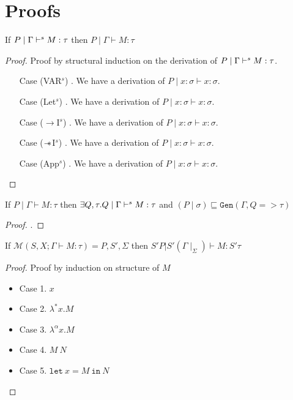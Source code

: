 \chapter{Proofs}
\begin{thm}\label{thm:soundness-syntax-directed}
   If $P \mid \Gamma \vdash^s M:\tau$ then $P \mid \Gamma \vdash M:\tau$
\end{thm}
\begin{proof}
  Proof by structural induction on the derivation of $P \mid \Gamma \vdash^s M:\tau$.
  \begin{itemize}
  \item[Case (VAR$^s$)]. We have a derivation of $P \mid x:\sigma \vdash x:\sigma$.
  \item[Case (Let$^s$)]. We have a derivation of $P \mid x:\sigma \vdash x:\sigma$.
  \item[Case ($\rightarrow$I$^s$)]. We have a derivation of $P \mid x:\sigma \vdash x:\sigma$.
  \item[Case ($\mathrel{-\mkern-6mu*}$I$^s$)]. We have a derivation of $P \mid x:\sigma \vdash x:\sigma$.
  \item[Case (App$^s$)]. We have a derivation of $P \mid x:\sigma \vdash x:\sigma$.
  \end{itemize}
\end{proof}

\begin{thm}\label{thm:completeness-syntax-directed}
  If $P \mid \Gamma \vdash M:\tau$ then
  $\exists Q,\tau. Q \mid \Gamma \vdash^s M:\tau$
  and $(P \mid \sigma) \sqsubseteq \texttt{Gen}(\Gamma, Q => \tau)$
\end{thm}
\begin{proof}
  .
\end{proof}

\begin{thm}
   If $\mathcal{M}(S, X; \Gamma \vdash M : \tau) = P, S', \Sigma$ then $S' P | S' (\Gamma\mid_{\Sigma}) \vdash M : S' \tau$
\end{thm}
\begin{proof}
  Proof by induction on structure of $M$
  \begin{itemize}
  \item Case 1. $x$
  \item Case 2. $\lambda^{*} x. M$
  \item Case 3. $\lambda ^{\alpha}x. M$
  \item Case 4. $M\ N$
  \item Case 5. $\texttt{let}\ x = M\ \texttt{in}\ N$
  \end{itemize}
\end{proof}


